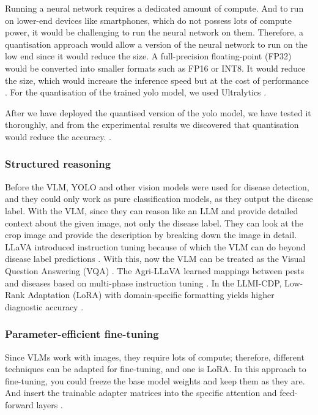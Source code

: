 Running a neural network requires a dedicated amount of compute. And to run on lower-end devices like smartphones, which do not possess lots of compute power, it would be challenging to run the neural network on them. Therefore, a quantisation approach would allow a version of the neural network to run on the low end since it would reduce the size. A full-precision floating-point (FP32) would be converted into smaller formats such as FP16 or INT8. It would reduce the size, which would increase the inference speed but at the cost of performance \parencite{garg2022quantizationSurvey}. 
For the quantisation of the trained yolo model, we used Ultralytics \parencite{ultralyticsExport}.

After we have deployed the quantised version of the yolo model, we have tested it thoroughly, and from the experimental results we discovered that quantisation would reduce the accuracy. \parencite{paleyes2022MLSystemsChallenges}.

 


\subsubsection{Structured reasoning}

Before the VLM, YOLO and other vision models were used for disease detection, and they could only work as pure classification models, as they output the disease label. With the VLM, since they can reason like an LLM and provide detailed context about the given image, not only the disease label. They can look at the crop image and provide the description by breaking down the image in detail. LLaVA introduced instruction tuning because of which the VLM can do beyond disease label predictions \parencite{liuLLaVA2023}. With this, now the VLM can be treated as the  Visual Question Answering (VQA) \parencite{zhangVLMSurvey2024}. 
The Agri-LLaVA learned mappings between pests and diseases based on multi-phase instruction tuning \parencite{wangAgriLLaVA2024}. In the LLMI-CDP, Low-Rank Adaptation (LoRA) with domain-specific formatting yields higher diagnostic accuracy \parencite{yangLLMCropDisease2024}. 

\subsubsection{Parameter-efficient fine-tuning}

Since VLMs work with images, they require lots of compute; therefore, different techniques can be adapted for fine-tuning, and one is LoRA. In this approach to fine-tuning, you could freeze the base model weights and keep them as they are. And insert the trainable adapter matrices into the specific attention and feed-forward layers \parencite{hu2021lora}. 

